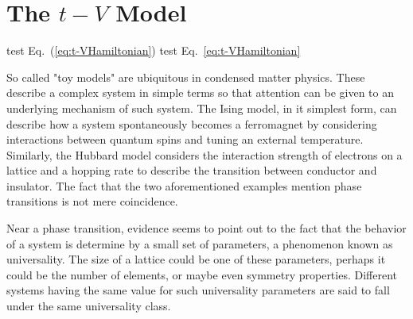 \section{The $t-V$ Model}
\label{sec:t-VIntro}

test Eq.~(\ref{eq:t-VHamiltonian})
test Eq.~\eqref{eq:t-VHamiltonian}

So called "toy models" are ubiquitous in condensed matter physics. These describe a complex system in simple terms so that attention can be given to an underlying mechanism of such system. The Ising model, in it simplest form, can describe how a system spontaneously becomes a ferromagnet by considering interactions between quantum spins and tuning an external temperature. Similarly, the Hubbard model considers the interaction strength of electrons on a lattice and a hopping rate to describe the transition between conductor and insulator. The fact that the two aforementioned examples mention phase transitions is not mere coincidence. 

Near a phase transition, evidence seems to point out to the fact that the behavior of a system is determine by a small set of parameters, a phenomenon known as universality. The size of a lattice could be one of these parameters, perhaps it could be the number of elements, or maybe even symmetry properties. Different systems having the same value for such universality parameters are said to fall under the same universality class. 


